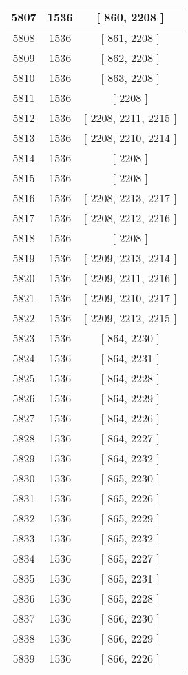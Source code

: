 \begin{center}
\begin{longtable}[H]{|| c c c ||}
\hline
5807 & 1536 & [ 860, 2208 ] \\ 
\hline
5808 & 1536 & [ 861, 2208 ] \\ 
\hline
5809 & 1536 & [ 862, 2208 ] \\ 
\hline
5810 & 1536 & [ 863, 2208 ] \\ 
\hline
5811 & 1536 & [ 2208 ] \\ 
\hline
5812 & 1536 & [ 2208, 2211, 2215 ] \\ 
\hline
5813 & 1536 & [ 2208, 2210, 2214 ] \\ 
\hline
5814 & 1536 & [ 2208 ] \\ 
\hline
5815 & 1536 & [ 2208 ] \\ 
\hline
5816 & 1536 & [ 2208, 2213, 2217 ] \\ 
\hline
5817 & 1536 & [ 2208, 2212, 2216 ] \\ 
\hline
5818 & 1536 & [ 2208 ] \\ 
\hline
5819 & 1536 & [ 2209, 2213, 2214 ] \\ 
\hline
5820 & 1536 & [ 2209, 2211, 2216 ] \\ 
\hline
5821 & 1536 & [ 2209, 2210, 2217 ] \\ 
\hline
5822 & 1536 & [ 2209, 2212, 2215 ] \\ 
\hline
5823 & 1536 & [ 864, 2230 ] \\ 
\hline
5824 & 1536 & [ 864, 2231 ] \\ 
\hline
5825 & 1536 & [ 864, 2228 ] \\ 
\hline
5826 & 1536 & [ 864, 2229 ] \\ 
\hline
5827 & 1536 & [ 864, 2226 ] \\ 
\hline
5828 & 1536 & [ 864, 2227 ] \\ 
\hline
5829 & 1536 & [ 864, 2232 ] \\ 
\hline
5830 & 1536 & [ 865, 2230 ] \\ 
\hline
5831 & 1536 & [ 865, 2226 ] \\ 
\hline
5832 & 1536 & [ 865, 2229 ] \\ 
\hline
5833 & 1536 & [ 865, 2232 ] \\ 
\hline
5834 & 1536 & [ 865, 2227 ] \\ 
\hline
5835 & 1536 & [ 865, 2231 ] \\ 
\hline
5836 & 1536 & [ 865, 2228 ] \\ 
\hline
5837 & 1536 & [ 866, 2230 ] \\ 
\hline
5838 & 1536 & [ 866, 2229 ] \\ 
\hline
5839 & 1536 & [ 866, 2226 ] \\ 

\end{longtable}
\end{center}
